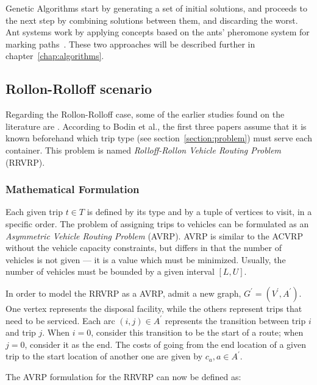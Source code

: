Genetic Algorithms start by generating a set of initial solutions, and proceeds
to the next step by combining solutions between them, and discarding the worst.
Ant systems work by applying concepts based on the ants' pheromone system for
marking paths~\citep{Colorni91}. These two approaches will be described further
in chapter~\ref{chap:algorithms}.







\subsection{Rollon-Rolloff scenario}
\label{section:rrvrp}

Regarding the Rollon-Rolloff case, some of the earlier studies found on the
literature are \citet{Cristallo94,Meulemeester97,Bodin00}.  According to Bodin
et al., the first three papers assume that it is known beforehand which trip
type (see section~\ref{section:problem}) must serve each container. This
problem is named \textit{Rolloff-Rollon Vehicle Routing Problem} (RRVRP).

\subsubsection{Mathematical Formulation}

Each given trip $t \in T$ is defined by its type and by a tuple of vertices to
visit, in a specific order. The problem of assigning trips to vehicles can be
formulated as an \textit{Asymmetric Vehicle Routing Problem} (AVRP). AVRP is
similar to the ACVRP without the vehicle capacity constraints, but differs in
that the number of vehicles is not given --- it is a value which must be
minimized. Usually, the number of vehicles must be bounded by a given interval
$[L, U]$.

In order to model the RRVRP as a AVRP, admit a new graph, $G^\prime =
(V^\prime, A^\prime)$. One vertex represents the disposal facility, while the
others represent trips that need to be serviced. Each arc $(i, j) \in A^\prime$
represents the transition between trip $i$ and trip $j$. When $i = 0$, consider
this transition to be the start of a route; when $j = 0$, consider it as the
end. The costs of going from the end location of a given trip to the start
location of another one are given by $c_{a}, a \in A^\prime$.

The AVRP formulation for the RRVRP can now be defined as:

